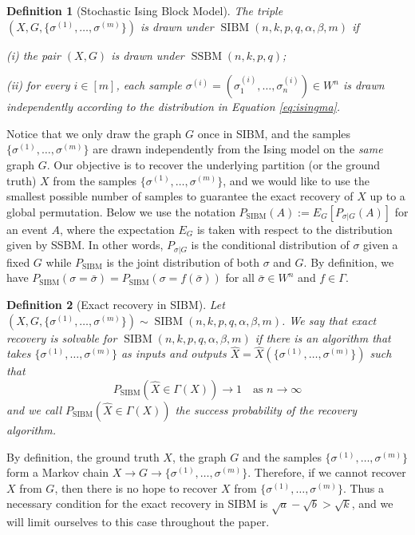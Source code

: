 \label{key}\documentclass[conference]{IEEEtran}
\newtheorem{definition}{Definition}%
\DeclareMathOperator{\SSBM}{SSBM}
\DeclareMathOperator{\SIBM}{SIBM}
\begin{document}
\begin{definition}[Stochastic Ising Block Model]
The triple $(X,G,\{\sigma^{(1)},\dots,\sigma^{(m)}\})$ is drawn under $\SIBM(n,k, p,q,\alpha,\beta,m)$ if

\noindent
(i) the pair $(X,G)$ is drawn under $\SSBM(n,k, p,q)$;

\noindent
(ii) for every $i\in[m]$, each sample $\sigma^{(i)}=(\sigma_1^{(i)},\dots,\sigma_n^{(i)}) \in W^n$ is drawn independently according to the distribution in Equation \eqref{eq:isingma}.
\end{definition}

Notice that we only draw the graph $G$ once in SIBM, and the samples $\{\sigma^{(1)},\dots,\sigma^{(m)}\}$ are drawn independently from the Ising model on the {\em same} graph $G$.
Our objective is to recover the underlying partition (or the ground truth) $X$ from the samples $\{\sigma^{(1)},\dots,\sigma^{(m)}\}$, and we would like to use the smallest possible number of samples to guarantee the exact recovery of $X$ up to a global permutation.
Below we use the notation $P_{\SIBM}(A):=E_G[P_{\sigma|G}(A)]$ for an event $A$, where the expectation $E_G$ is taken with respect to the distribution given by SSBM. In other words, $P_{\sigma|G}$ is the conditional distribution of  $\sigma$ given a fixed $G$ while $P_{\SIBM}$ is the joint distribution of both $\sigma$ and $G$.
By definition, we have $P_{\SIBM}(\sigma=\bar{\sigma})=P_{\SIBM}(\sigma=f(\bar{\sigma}))$ for all $\bar{\sigma}\in W^n$ and $f\in \Gamma$.


\begin{definition}[Exact recovery in SIBM]
Let $(X,G,\{\sigma^{(1)},\dots,\sigma^{(m)}\}) \sim \SIBM(n,k,p,q,\alpha,\beta,m)$.
We say that exact recovery is solvable for $\SIBM(n,k,p,q,\alpha,\beta,m)$ if there is an algorithm that takes $\{\sigma^{(1)},\dots,\sigma^{(m)}\}$ as inputs and outputs $\hat{X}=\hat{X}(\{\sigma^{(1)},\dots,\sigma^{(m)}\})$ such that
$$
P_{\SIBM}(\hat{X} \in \Gamma(X)) \to 1
\text{~~~as~} n\to\infty
$$
and we call $P_{\SIBM}(\hat{X} \in \Gamma(X))$ the success probability of the recovery algorithm.
\end{definition}

By definition, the ground truth $X$, the graph $G$ and the samples $\{\sigma^{(1)},\dots,\sigma^{(m)}\}$ form a Markov chain $X\to G\to \{\sigma^{(1)},\dots,\sigma^{(m)}\}$. Therefore, if we cannot recover $X$ from $G$, then there is no hope to recover $X$ from $\{\sigma^{(1)},\dots,\sigma^{(m)}\}$. Thus a necessary condition for the exact recovery in SIBM is $\sqrt{a}-\sqrt{b}> \sqrt{k}$, and we will limit ourselves to this case throughout the paper.
\end{document}
